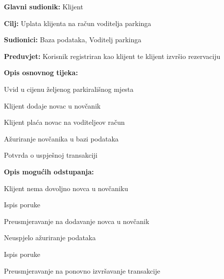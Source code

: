 \begin{packed_item}
\begin{packed_item}
    				\item \textbf{Glavni sudionik: } Klijent
    				\item  \textbf{Cilj:} Uplata klijenta na račun voditelja parkinga
    				\item  \textbf{Sudionici:} Baza podataka, Voditelj parkinga
    				\item  \textbf{Preduvjet:} Korisnik registriran kao klijent te klijent izvršio rezervaciju
    				\item  \textbf{Opis osnovnog tijeka:}
    				
    				\item[] \begin{packed_enum}
    					
    					\item Uvid u cijenu željenog parkirališnog mjesta
    					\item Klijent dodaje novac u novčanik
    					\item Klijent plaća novac na voditeljeov račun
    					\item Ažuriranje novčanika u bazi podataka
    					\item Potvrda o uspješnoj transakciji

    				\end{packed_enum}
    				
    				\item  \textbf{Opis mogućih odstupanja:}
    				
    				\item[] \begin{packed_item}
    					
    					\item[2.a] Klijent nema dovoljno novca u novčaniku
    					\item[] \begin{packed_enum}
    						
    						\item Ispis poruke
    						\item Preusmjeravanje na dodavanje novca u novčanik
    						
    					\end{packed_enum}
    					\item[3.a] Neuspjelo ažuriranje podataka
						\item[] \begin{packed_enum}
							
							\item Ispis poruke
							\item Preusmjeravanje na ponovno izvršavanje transakcije
							

\end{packed_enum}
\end{packed_item}
\end{packed_item}
\end{packed_item}

